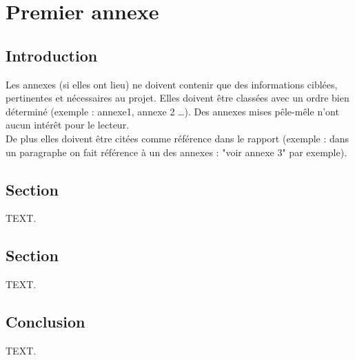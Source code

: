 \chapter{Premier annexe}
\section{Introduction}
Les annexes (si elles ont lieu) ne doivent contenir que des informations cibl\'{e}es, pertinentes et
n\'{e}cessaires au projet. Elles doivent \^{e}tre class\'{e}es avec un ordre bien d\'{e}termin\'{e} (exemple :
annexe1, annexe 2 \ldots). Des annexes mises p\^{e}le-m\^{e}le n'ont aucun int\'{e}r\^{e}t pour le lecteur.\\

De plus elles doivent \^{e}tre cit\'{e}es comme r\'{e}f\'{e}rence dans le rapport (exemple : dans un
paragraphe on fait r\'{e}f\'{e}rence \`{a} un des annexes : "voir annexe 3" par exemple).
\section{Section}
TEXT.
\section{Section}
TEXT.
\section{Conclusion}
TEXT.
